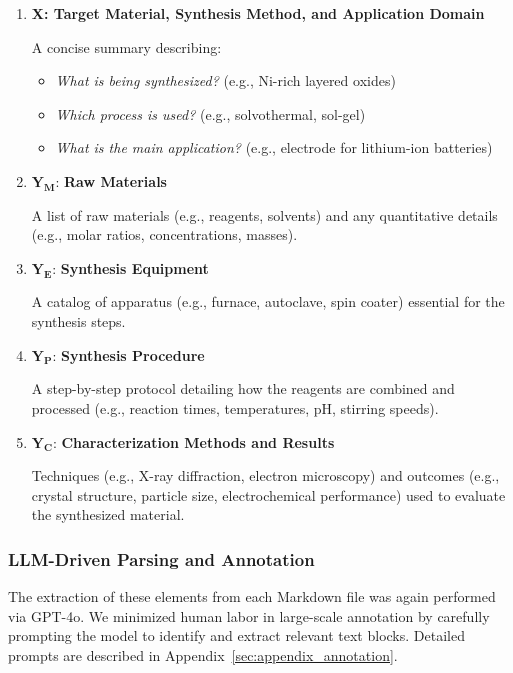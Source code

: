 \begin{enumerate}
    \item \textbf{X: Target Material, Synthesis Method, and Application Domain}
    
    A concise summary describing:
    \begin{itemize}
        \item \textit{What is being synthesized?} (e.g., Ni-rich layered oxides)
        \item \textit{Which process is used?} (e.g., solvothermal, sol-gel)
        \item \textit{What is the main application?} (e.g., electrode for lithium-ion batteries)
    \end{itemize}
    
    \item \(\mathbf{Y_M}\): \textbf{Raw Materials}
    
    A list of raw materials (e.g., reagents, solvents) and any quantitative details (e.g., molar ratios, concentrations, masses).
    
    \item \(\mathbf{Y_E}\): \textbf{Synthesis Equipment}
    
    A catalog of apparatus (e.g., furnace, autoclave, spin coater) essential for the synthesis steps.
    
    \item \(\mathbf{Y_P}\): \textbf{Synthesis Procedure}
    
    A step-by-step protocol detailing how the reagents are combined and processed (e.g., reaction times, temperatures, pH, stirring speeds).
    
    \item \(\mathbf{Y_C}\): \textbf{Characterization Methods and Results}
    
    Techniques (e.g., X-ray diffraction, electron microscopy) and outcomes (e.g., crystal structure, particle size, electrochemical performance) used to evaluate the synthesized material.
\end{enumerate}

\subsubsection{LLM-Driven Parsing and Annotation}
The extraction of these elements from each Markdown file was again performed via GPT-4o. We minimized human labor in large-scale annotation by carefully prompting the model to identify and extract relevant text blocks.
Detailed prompts are described in Appendix~\ref{sec:appendix_annotation}.

